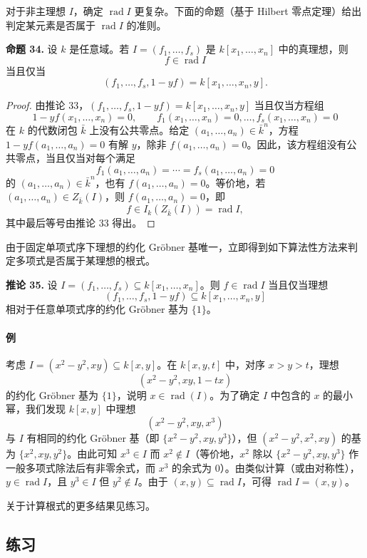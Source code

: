 对于非主理想 $I$，确定 $\operatorname{rad}I$ 更复杂。下面的命题（基于 Hilbert 零点定理）给出判定某元素是否属于 $\operatorname{rad}I$ 的准则。

\noindent\textbf{命题 34.} 设 $k$ 是任意域。若 $I=(f_1,
\ldots,f_s)$ 是 $k[x_1,
\ldots,x_n]$ 中的真理想，则
\[
f\in\operatorname{rad}I
\]
当且仅当
\[
(f_1,
\ldots,f_s,1-yf)=k[x_1,
\ldots,x_n,y].
\]

\begin{proof}
	由推论 33，$(f_1,
	\ldots,f_s,1-yf)=k[x_1,
	\ldots,x_n,y]$ 当且仅当方程组
	\[
	1-yf(x_1,
	\ldots,x_n)=0,
	\qquad
	f_1(x_1,
	\ldots,x_n)=0,
	\ldots,
	f_s(x_1,
	\ldots,x_n)=0
	\]
	在 $k$ 的代数闭包 $\bar k$ 上没有公共零点。给定 $(a_1,
	\ldots,a_n)\in\bar k^n$，方程 $1-yf(a_1,
	\ldots,a_n)=0$ 有解 $y$，除非 $f(a_1,
	\ldots,a_n)=0$。因此，该方程组没有公共零点，当且仅当对每个满足
	\[
	f_1(a_1,
	\ldots,a_n)=\cdots=f_s(a_1,
	\ldots,a_n)=0
	\]
	的 $(a_1,
	\ldots,a_n)\in\bar k^n$，也有 $f(a_1,
	\ldots,a_n)=0$。等价地，若 $(a_1,
	\ldots,a_n)\in Z_{\bar k}(I)$，则 $f(a_1,
	\ldots,a_n)=0$，即
	\[
	f\in I_k(Z_{\bar k}(I))=\operatorname{rad}I,
	\]
	其中最后等号由推论 33 得出。
\end{proof}

由于固定单项式序下理想的约化 Gröbner 基唯一，立即得到如下算法性方法来判定多项式是否属于某理想的根式。

\noindent\textbf{推论 35.} 设 $I=(f_1,
\ldots,f_s)\subseteq k[x_1,
\ldots,x_n]$。则 $f\in\operatorname{rad}I$ 当且仅当理想
\[
(f_1,
\ldots,f_s,1-yf)\subseteq k[x_1,
\ldots,x_n,y]
\]
相对于任意单项式序的约化 Gröbner 基为 $\{1\}$。

\paragraph{例}
考虑 $I=(x^2-y^2,xy)\subseteq k[x,y]$。在 $k[x,y,t]$ 中，对序 $x>y>t$，理想
\[
(x^2-y^2,xy,1-tx)
\]
的约化 Gröbner 基为 $\{1\}$，说明 $x\in\operatorname{rad}(I)$。为了确定 $I$ 中包含的 $x$ 的最小幂，我们发现 $k[x,y]$ 中理想
\[
(x^2-y^2,xy,x^3)
\]
与 $I$ 有相同的约化 Gröbner 基（即 $\{x^2-y^2,xy,y^3\}$），但 $(x^2-y^2,x^2,xy)$ 的基为 $\{x^2,xy,y^2\}$。由此可知 $x^3\in I$ 而 $x^2\notin I$（等价地，$x^2$ 除以 $\{x^2-y^2,xy,y^3\}$ 作一般多项式除法后有非零余式，而 $x^3$ 的余式为 $0$）。由类似计算（或由对称性），$y\in\operatorname{rad}I$，且 $y^3\in I$ 但 $y^2\notin I$。由于 $(x,y)\subseteq\operatorname{rad}I$，可得 $\operatorname{rad}I=(x,y)$。

关于计算根式的更多结果见练习。

\subsection*{练习}

